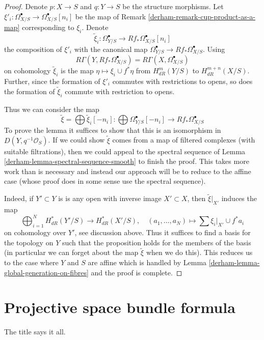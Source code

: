\begin{proof}

Denote $p : X \to S$ and $q : Y \to S$ be the structure morphisms.
Let $\xi'_i : \Omega^\bullet_{X/S} \to \Omega^\bullet_{X/S}[n_i]$
be the map of Remark \ref{derham-remark-cup-product-as-a-map} corresponding
to $\xi_i$. Denote
$$
\tilde \xi_i :
\Omega^\bullet_{Y/S} \to Rf_*\Omega^\bullet_{X/S}[n_i]
$$
the composition of $\xi'_i$ with the canonical map
$\Omega^\bullet_{Y/S} \to Rf_*\Omega^\bullet_{X/S}$.
Using
$$
R\Gamma(Y, Rf_*\Omega^\bullet_{X/S}) = R\Gamma(X, \Omega^\bullet_{X/S})
$$
on cohomology $\tilde \xi_i$ is the map $\eta \mapsto \xi_i \cup f^*\eta$
from $H^m_{dR}(Y/S)$ to $H^{m + n}_{dR}(X/S)$.
Further, since the formation of $\xi'_i$ commutes with
restrictions to opens, so does the formation of $\tilde \xi_i$
commute with restriction to opens.

\medskip\noindent
Thus we can consider the map
$$
\tilde \xi = \bigoplus \tilde \xi_i[-n_i] :
\bigoplus \Omega^\bullet_{Y/S}[-n_i]
\longrightarrow
Rf_*\Omega^\bullet_{X/S}
$$
To prove the lemma it suffices to show that this is an isomorphism in
$D(Y, q^{-1}\mathcal{O}_S)$. If we could show $\tilde \xi$
comes from a map of filtered complexes (with suitable filtrations),
then we could appeal to the spectral sequence of
Lemma \ref{derham-lemma-spectral-sequence-smooth} to finish the proof.
This takes more work than is necessary and instead our approach
will be to reduce to the affine case (whose proof does in some sense
use the spectral sequence).

\medskip\noindent
Indeed, if $Y' \subset Y$ is is any open with inverse image
$X' \subset X$, then $\tilde \xi|_{X'}$ induces the map
$$
\bigoplus\nolimits_{i = 1}^N H^*_{dR}(Y'/S) \longrightarrow
H^*_{dR}(X'/S), \quad
(a_1, \ldots, a_N) \longmapsto  \sum \xi_i|_{X'} \cup f^*a_i
$$
on cohomology over $Y'$, see discussion above.
Thus it suffices to find a basis for the topology
on $Y$ such that the proposition holds for the members of the basis
(in particular we can forget about the map $\tilde \xi$ when
we do this). This reduces us to the case where $Y$ and $S$
are affine which is handled by Lemma \ref{derham-lemma-global-generation-on-fibres}
and the proof is complete.
\end{proof}

\section{Projective space bundle formula}
\label{derham-section-projective-space-bundle-formula}
The title says it all.

